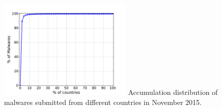 \begin{figure}[t!]
\begin{center}
\includegraphics[width=2.5in]{figure/country}
{Accumulation distribution of malwares submitted from different countries in November 2015.}
\end{center}
\vspace{-0.25in}
\end{figure}